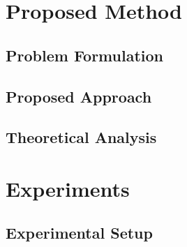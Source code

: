 \section{Proposed Method}
\label{sec:method}

\subsection{Problem Formulation}

\subsection{Proposed Approach}


\subsection{Theoretical Analysis}

\section{Experiments}
\label{sec:experiments}

\subsection{Experimental Setup}

